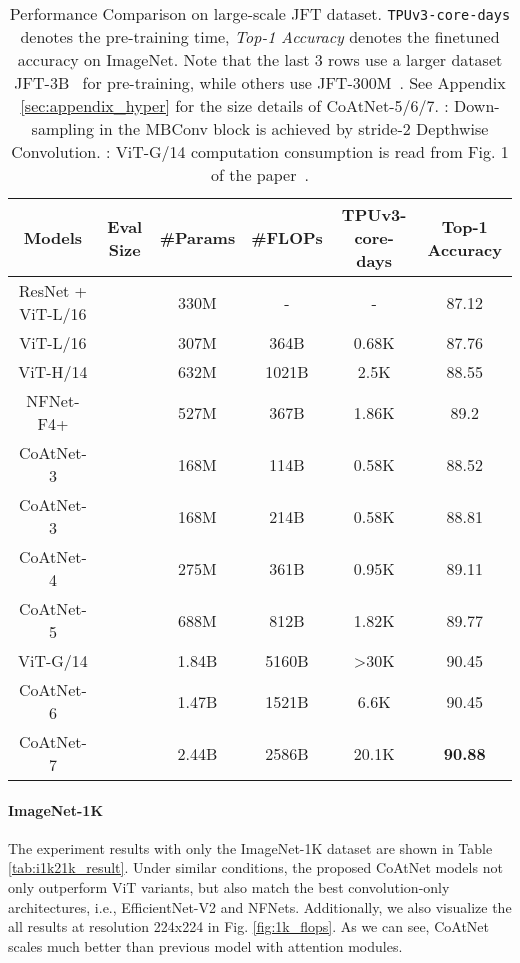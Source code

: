 \documentclass{article}
\newcommand{\name}{CoAtNet\xspace}
\begin{document}
\begin{table}[!htbp]
    \centering
    \vspace{-1em}
    \caption{Performance Comparison on large-scale JFT dataset. \texttt{TPUv3-core-days} denotes the pre-training time, \textit{Top-1 Accuracy} denotes the finetuned accuracy on ImageNet. Note that the last 3 rows use a larger dataset JFT-3B~\cite{zhai2021scaling} for pre-training, while others use JFT-300M~\cite{sun2017revisiting}.
    See Appendix \ref{sec:appendix_hyper} for the size details of \name-5/6/7. 
    : Down-sampling in the MBConv block is achieved by stride-2 Depthwise Convolution.
    : ViT-G/14 computation consumption is read from Fig. 1 of the paper~\cite{zhai2021scaling}.}
    \begin{tabular}{ccccc|c}
    \midrule 
        \bf Models & \bf Eval Size & \bf \#Params & \bf \#FLOPs & \bf TPUv3-core-days & \bf Top-1 Accuracy \\ 
        \midrule
        ResNet + ViT-L/16 &  & 330M & - & - & 87.12 \\
        ViT-L/16  &  & 307M & 364B   & 0.68K & 87.76 \\
        ViT-H/14  &  & 632M & 1021B  & 2.5K  & 88.55 \\
        NFNet-F4+ &  & 527M & 367B   & 1.86K & 89.2 \\
        \midrule
        \name-3 &  & 168M & 114B & 0.58K & 88.52 \\
        \name-3 &  & 168M & 214B & 0.58K & 88.81 \\
        \name-4   &  & 275M & 361B   & 0.95K & 89.11 \\
        \name-5   &  & 688M & 812B   & 1.82K & 89.77 \\
        \midrule
        ViT-G/14  &  & 1.84B & 5160B & >30K & 90.45 \\
        \name-6   &  & 1.47B & 1521B & 6.6K  & 90.45 \\
        \name-7   &  & 2.44B & 2586B & 20.1K & \bf 90.88 \\
        \bottomrule
    \end{tabular}
    \label{tab:jft_result}
    \vspace{-1em}
\end{table}

\paragraph{ImageNet-1K} The experiment results with only the ImageNet-1K dataset are shown in Table \ref{tab:i1k21k_result}.
Under similar conditions, the proposed \name models not only outperform ViT variants, but also match the best convolution-only architectures, i.e., EfficientNet-V2 and NFNets.
Additionally, we also visualize the all results at resolution 224x224 in Fig. \ref{fig:1k_flops}.
As we can see, \name scales much better than previous model with attention modules.
\end{document}

